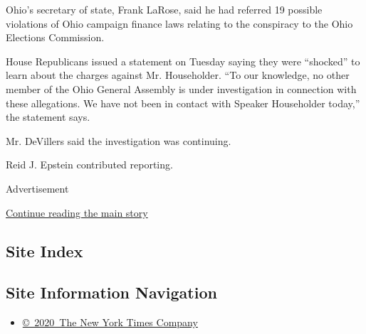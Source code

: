 Ohio's secretary of state, Frank LaRose, said he had referred 19
possible violations of Ohio campaign finance laws relating to the
conspiracy to the Ohio Elections Commission.

House Republicans issued a statement on Tuesday saying they were
``shocked'' to learn about the charges against Mr. Householder. ``To our
knowledge, no other member of the Ohio General Assembly is under
investigation in connection with these allegations. We have not been in
contact with Speaker Householder today,'' the statement says.

Mr. DeVillers said the investigation was continuing.

Reid J. Epstein contributed reporting.

Advertisement

\protect\hyperlink{after-bottom}{Continue reading the main story}

\hypertarget{site-index}{%
\subsection{Site Index}\label{site-index}}

\hypertarget{site-information-navigation}{%
\subsection{Site Information
Navigation}\label{site-information-navigation}}

\begin{itemize}
\tightlist
\item
  \href{https://help.nytimes3xbfgragh.onion/hc/en-us/articles/115014792127-Copyright-notice}{©~2020~The
  New York Times Company}
\end{itemize}

